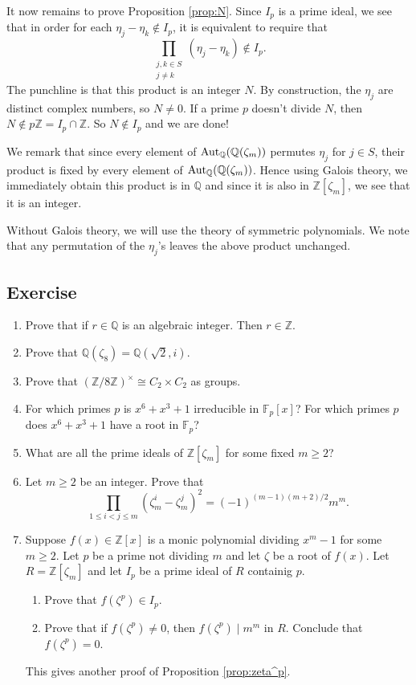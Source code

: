 \documentclass{article}
\def\Z{{\mathbb Z}}
\def\Aut{{\rm Aut}}
\def\F{{\mathbb F}}
\def\Q{{\mathbb Q}}
\def\Z{{\mathbb Z}}
\def\F{{\mathbb F}}
\def\Q{{\mathbb Q}}
\begin{document}
It now remains to prove Proposition \ref{prop:N}. Since $I_p$ is a prime ideal, we see that in order for each $\eta_j - \eta_k\notin I_p$, it is equivalent to require that $$\prod_{\substack{j, k\in S\\ j\neq k}} (\eta_j-\eta_k) \notin I_p.$$
The punchline is that this product is an integer $N$. By construction, the $\eta_j$ are distinct complex numbers, so $N\neq 0$. If a prime $p$ doesn't divide $N$, then $N\notin p\Z = I_p\cap \Z$. So $N\notin I_p$ and we are done!

We remark that since every element of $\Aut_\Q(\Q(\zeta_m))$ permutes $\eta_j$ for $j\in S$, their product is fixed by every element of $\Aut_\Q(\Q(\zeta_m))$. Hence using Galois theory, we immediately obtain this product is in $\Q$ and since it is also in $\Z[\zeta_m]$, we see that it is an integer.

Without Galois theory, we will use the theory of symmetric polynomials. We note that any permutation of the $\eta_j$'s leaves the above product unchanged.

\subsection*{Exercise}
\begin{enumerate}[\thesection .1]
    \item Prove that if $r\in\Q$ is an algebraic integer. Then $r\in\Z$.
    \item Prove that $\Q(\zeta_8) = \Q(\sqrt{2}, i).$
    \item Prove that $(\Z/8\Z)^\times\cong C_2\times C_2$ as groups.
    \item For which primes $p$ is $x^6 + x^3 + 1$ irreducible in $\F_p[x]$? For which primes $p$ does $x^6 + x^3 + 1$ have a root in $\F_p$?
    \item What are all the prime ideals of $\Z[\zeta_m]$ for some fixed $m\geq 2$?
    \item Let $m\geq2$ be an integer. Prove that $$\prod_{1\leq i < j\leq m} (\zeta_m^i - \zeta_m^j)^2 = (-1)^{(m-1)(m+2)/2}m^m.$$\label{exer:15.6}
    \item Suppose $f(x)\in\Z[x]$ is a monic polynomial dividing $x^m - 1$ for some $m\geq 2$. Let $p$ be a prime not dividing $m$ and let $\zeta$ be a root of $f(x)$. Let $R = \Z[\zeta_m]$ and let $I_p$ be a prime ideal of $R$ containig $p$.
    \begin{enumerate}
        \item Prove that $f(\zeta^p)\in I_p.$
        \item Prove that if $f(\zeta^p)\neq 0$, then $f(\zeta^p)\mid m^m$ in $R$. Conclude that $f(\zeta^p) = 0$.
    \end{enumerate}
    This gives another proof of Proposition \ref{prop:zeta^p}.
\end{enumerate}
\end{document}
